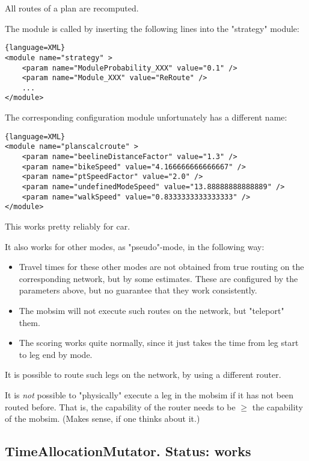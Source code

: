 
All routes of a plan are recomputed.

The module is called by inserting the following lines into the "strategy" module:
\begin{lstlisting}{language=XML}
<module name="strategy" >
    <param name="ModuleProbability_XXX" value="0.1" />
    <param name="Module_XXX" value="ReRoute" />
    ...
</module>
\end{lstlisting}


The corresponding configuration module unfortunately has a different name:
\begin{lstlisting}{language=XML}
<module name="planscalcroute" >
    <param name="beelineDistanceFactor" value="1.3" />
    <param name="bikeSpeed" value="4.166666666666667" />
    <param name="ptSpeedFactor" value="2.0" />
    <param name="undefinedModeSpeed" value="13.88888888888889" />
    <param name="walkSpeed" value="0.8333333333333333" />
</module>
\end{lstlisting}

This works pretty reliably for car.

It also works for other modes, as "pseudo"-mode, in the following way:
\begin{itemize}
	\item Travel times for these other modes are not obtained from true  routing on the corresponding network, but by some estimates. These  are configured by the parameters above, but no guarantee that they work  consistently.
	\item The mobsim will not execute such routes on the network, but "teleport" them.
	\item The scoring works quite normally, since it just takes the time from leg start to leg end by mode.
\end{itemize}

It is possible to route such legs on the network, by using a different router.

It is \emph{not} possible to "physically" execute a leg in the  mobsim if it has not been routed before. That is, the capability  of the router needs to be $\ge$ the capability of the mobsim.  (Makes sense, if one thinks about it.)

\subsection{TimeAllocationMutator.  Status: works}

